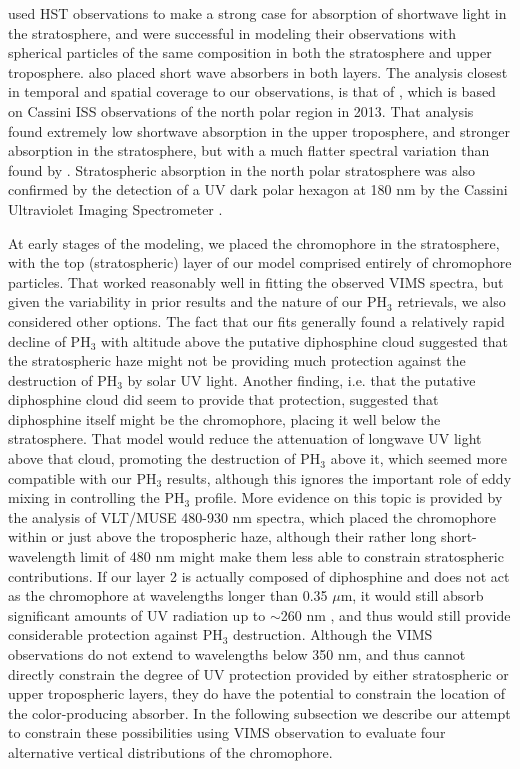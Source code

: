 \documentclass[article,11pt]{emulateapj}
\def\mumx{$\mu$m}
\def\pht{PH$_3$ }
\begin{document}
 \cite{Kark2005} used HST observations to make a
strong case for absorption of shortwave light in the stratosphere, and were
successful in modeling their observations with spherical particles of
 the same composition
 in both the stratosphere and upper troposphere. \cite{Perez-Hoyos2005}
also placed short wave absorbers in both layers.  The analysis closest in
temporal and spatial coverage to our observations, is that of \cite{Sanz-Requena2018},
which is based on Cassini ISS observations of the north polar region in 2013. That 
analysis found extremely low shortwave absorption in the upper troposphere,
and stronger absorption in the stratosphere, but with a much flatter
spectral variation than found by \cite{Kark2005}.  Stratospheric
absorption in the north polar stratosphere was also confirmed
by the detection of a UV dark polar hexagon at 180 nm by
the Cassini Ultraviolet Imaging Spectrometer \citep{Pryor2019JGRE}.

At early stages of the modeling, we placed the chromophore in the
stratosphere, with the top (stratospheric) layer of our model
comprised entirely of chromophore particles. That worked reasonably
well in fitting the observed VIMS spectra, but given the variability
in prior results and the nature of our \pht retrievals, we also
considered other options.  The fact that our fits generally found a
relatively rapid decline of \pht with altitude above the putative
diphosphine cloud suggested that the stratospheric haze might not be
providing much protection against the destruction of \pht by solar UV light.
Another finding, i.e. that the putative diphosphine cloud did seem to
provide that protection, suggested that diphosphine itself might
be the chromophore, placing it well below the stratosphere.  That
model would reduce the attenuation of longwave UV light above that
cloud, promoting the destruction of \pht above it, which seemed more
compatible with our \pht results, although this ignores the important
role of eddy mixing in controlling the \pht profile.  More evidence on
this topic is provided by the \cite{Braude2019EPSC} analysis of
VLT/MUSE 480-930 nm spectra, which placed the chromophore within or
just above the tropospheric haze, although their rather long
short-wavelength limit of 480 nm might make them less able to
constrain stratospheric contributions.  If our layer 2 is actually
composed of diphosphine and does not act as the chromophore at
wavelengths longer than 0.35 \mumx, it would still absorb significant
amounts of UV radiation up to $\sim$260 nm \citep{Ferris1981}, and
thus would still provide considerable protection against \pht destruction.
  Although the VIMS observations do not extend to wavelengths
below 350 nm, and thus cannot directly constrain the degree of UV
protection provided by either stratospheric or upper tropospheric
layers, they do have the potential to constrain the location of the
color-producing absorber. In the following subsection we describe
our attempt to constrain these possibilities using VIMS observation
to  evaluate four alternative vertical distributions of the chromophore.
\end{document}
